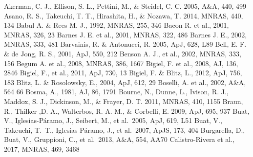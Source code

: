 \begin{thebibliography}{99}
\begin{multicols}{2}{\footnotesize
 	Akerman, C. J., Ellison, S. L., Pettini, M., \& Steidel, C. C. 2005, A\&A, 440, 499
	Asano, R. S., Takeuchi, T. T., Hirashita, H., \& Nozawa, T. 2014,
	MNRAS, 440, 134
	Babul A. \& Rees M. J., 1992, MNRAS, 255, 346
	Bacon R. et al., 2001, MNRAS, 326, 23
	Barnes J. E. et al., 2001, MNRAS, 322, 486
	Barnes J. E., 2002, MNRAS, 333, 481
	Barvainis, R. \& Antonucci, R. 2005, ApJ, 628, L89
	Bell, E. F. \& de Jong, R. S., 2001, ApJ, 550, 212
	Benson A. J., et al., 2002, MNRAS, 333, 156
	Begum A. et al., 2008, MNRAS, 386, 1667
	Bigiel, F. et al., 2008, AJ, 136, 2846
	Bigiel, F., et al., 2011, ApJ, 730, 13
	Bigiel, F. \& Blitz, L., 2012, ApJ, 756, 183
	Blitz, L. \& Rosolowsky, E., 2004, ApJ, 612, 29
	Boselli, A. et al., 2002, A\&A, 564 66
	Bosma, A., 1981, AJ, 86, 1791
    	Bourne, N., Dunne, L., Ivison, R. J., Maddox, S. J., Dickinson, M.,
    	\& Frayer, D. T. 2011, MNRAS, 410, 1155
   	Braun, R., Thilker ,D. A., Walterbos, R. A. M., \& Corbelli, E. 2009,
   	ApJ, 695, 937
	Buat, V., Iglesias-P{\'a}ramo, J., Seibert, M., et al.\ 2005, ApJ, 619, L51 
	Buat, V., Takeuchi, T.~T., Iglesias-P{\'a}ramo, J., et al.\ 2007, ApJS, 173, 404 
	Burgarella, D., Buat, V., Gruppioni, C., et al.\ 2013, A\&A, 554, AA70 
	Calistro-Rivera et al., 2017, MNRAS, 469, 3468
}
\end{multicols}
\end{thebibliography}

